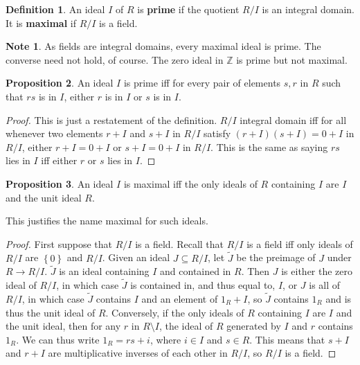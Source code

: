 \documentclass{article}
\newcommand{\Z}{\mathbb{Z}}
\newcommand{\rb}[1]{\left( #1 \right)}
\newcommand{\cb}[1]{\left\{ #1 \right\}}
\theoremstyle{definition}\newtheorem{definition}{Definition}[subsection]
\theoremstyle{definition}\newtheorem{remark}[definition]{Remark}
\theoremstyle{definition}\newtheorem*{example}{Example}
\theoremstyle{definition}\newtheorem*{note}{Note}
\newtheorem{proposition}[definition]{Proposition}
\begin{document}
\begin{definition}
An ideal $ I $ of $ R $ is \textbf{prime} if the quotient $ R / I $ is an integral domain. It is \textbf{maximal} if $ R / I $ is a field.
\end{definition}

\begin{note}
As fields are integral domains, every maximal ideal is prime. The converse need not hold, of course. The zero ideal in $ \Z $ is prime but not maximal.
\end{note}

\begin{proposition}
An ideal $ I $ is prime iff for every pair of elements $ s, r $ in $ R $ such that $ rs $ is in $ I $, either $ r $ is in $ I $ or $ s $ is in $ I $.
\end{proposition}

\begin{proof}
This is just a restatement of the definition. $ R / I $ integral domain iff for all whenever two elements $ r + I $ and $ s + I $ in $ R / I $ satisfy $ \rb{r + I}\rb{s + I} = 0 + I $ in $ R / I $, either $ r + I = 0 + I $ or $ s + I = 0 + I $ in $ R / I $. This is the same as saying $ rs $ lies in $ I $ iff either $ r $ or $ s $ lies in $ I $.
\end{proof}

\begin{proposition}
An ideal $ I $ is maximal iff the only ideals of $ R $ containing $ I $ are $ I $ and the unit ideal $ R $.
\end{proposition}

This justifies the name maximal for such ideals.

\begin{proof}
First suppose that $ R / I $ is a field. Recall that $ R / I $ is a field iff only ideals of $ R / I $ are $ \cb{0} $ and $ R / I $. Given an ideal $ J \subseteq R / I $, let $ \tilde{J} $ be the preimage of $ J $ under $ R \to R / I $. $ \tilde{J} $ is an ideal containing $ I $ and contained in $ R $. Then $ J $ is either the zero ideal of $ R / I $, in which case $ \tilde{J} $ is contained in, and thus equal to, $ I $, or $ J $ is all of $ R / I $, in which case $ \tilde{J} $ contains $ I $ and an element of $ 1_R + I $, so $ \tilde{J} $ contains $ 1_R $ and is thus the unit ideal of $ R $. Conversely, if the only ideals of $ R $ containing $ I $ are $ I $ and the unit ideal, then for any $ r $ in $ R \setminus I $, the ideal of $ R $ generated by $ I $ and $ r $ contains $ 1_R $. We can thus write $ 1_R = rs + i $, where $ i \in I $ and $ s \in R $. This means that $ s + I $ and $ r + I $ are multiplicative inverses of each other in $ R / I $, so $ R / I $ is a field.
\end{proof}
\end{document}
